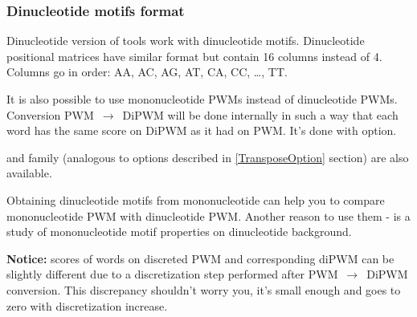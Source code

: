 \subsubsection{Dinucleotide motifs format}
Dinucleotide version of tools work with dinucleotide motifs. Dinucleotide positional matrices have similar format but contain 16 columns instead of 4. Columns go in order: AA, AC, AG, AT, CA, CC, \dots, TT.

It is also possible to use mononucleotide PWMs instead of dinucleotide PWMs. Conversion PWM~$\rightarrow$~DiPWM will be done internally in such a way that each word has the same score on DiPWM as it had on PWM. It's done with  option. 

 and family (analogous to options described in \ref{TransposeOption} section) are also available.

Obtaining dinucleotide motifs from mononucleotide can help you to compare mononucleotide PWM with dinucleotide PWM. Another reason to use them - is a study of mononucleotide motif properties on dinucleotide background.

{\small\textbf{Notice:} scores of words on discreted PWM and corresponding diPWM can be slightly different due to a discretization step performed after PWM~$\rightarrow$~DiPWM conversion. This discrepancy shouldn't worry you, it's small enough and goes to zero with discretization increase.}
